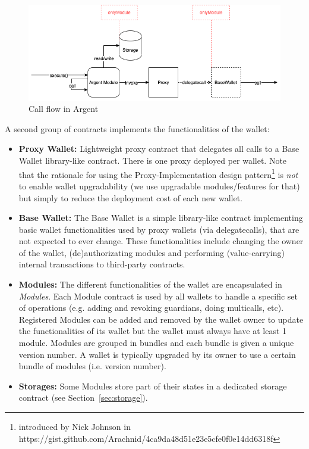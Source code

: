 \documentclass[12pt]{article}
\begin{document}
\begin{figure}[h]
    \label{fig:sc-flow}
    \includegraphics[width=\textwidth]{SC_Flow_3_x}
    \caption{Call flow in Argent}
\end{figure}

A second group of contracts implements the functionalities of the wallet:
\begin{itemize}
    \item \textbf{Proxy Wallet:} Lightweight proxy contract that delegates all calls to a Base Wallet library-like contract. There is one proxy deployed per wallet. Note that the rationale for using the Proxy-Implementation design pattern\footnote{ introduced by Nick Johnson in https://gist.github.com/Arachnid/4ca9da48d51e23e5cfe0f0e14dd6318f} is \emph{not} to enable wallet upgradability (we use upgradable modules/features for that) but simply to reduce the deployment cost of each new wallet.
    \item \textbf{Base Wallet:} The Base Wallet is a simple library-like contract implementing basic wallet functionalities used by proxy wallets (via delegatecalls), that are not expected to ever change. These functionalities include changing the owner of the wallet, (de)authorizating modules and performing (value-carrying) internal transactions to third-party contracts.
    \item \textbf{Modules:} The different functionalities of the wallet are encapsulated in \emph{Modules}. Each Module contract is used by all wallets to handle a specific set of operations (e.g. adding and revoking guardians, doing multicalls, etc). Registered Modules can be added and removed by the wallet owner to update the functionalities of its wallet but the wallet must always have at least 1 module. Modules are grouped in bundles and each bundle is given a unique version number. A wallet is typically upgraded by its owner to use a certain bundle of modules (i.e. version number). 
    \item \textbf{Storages:} Some Modules store part of their states in a dedicated storage contract (see Section~\ref{sec:storage}).
\end{itemize}
\end{document}
